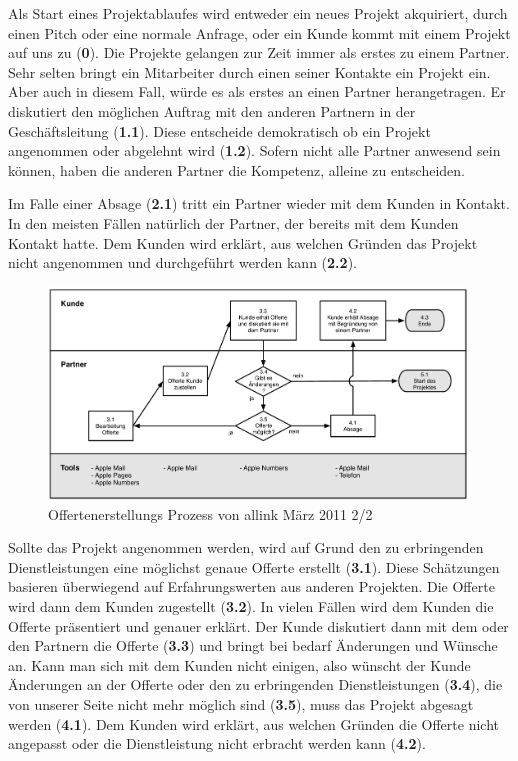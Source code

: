Als Start eines Projektablaufes wird entweder ein neues Projekt akquiriert, 
durch einen Pitch oder eine normale Anfrage, oder ein Kunde kommt mit einem
Projekt auf uns zu (\textbf{0}).
Die Projekte gelangen zur Zeit immer als erstes zu einem Partner. Sehr selten
bringt ein Mitarbeiter durch einen seiner Kontakte ein Projekt ein. Aber auch in
diesem Fall, würde es als erstes an einen Partner herangetragen.
Er diskutiert den möglichen Auftrag mit den anderen Partnern in der Geschäftsleitung (\textbf{1.1}).
Diese entscheide demokratisch ob ein Projekt angenommen oder abgelehnt wird (\textbf{1.2}). 
Sofern nicht alle Partner anwesend sein können, haben die anderen Partner
die Kompetenz, alleine zu entscheiden.

Im Falle einer Absage (\textbf{2.1}) tritt ein Partner wieder mit dem Kunden in Kontakt.
In den meisten Fällen natürlich der Partner, der bereits mit dem Kunden Kontakt
hatte. Dem Kunden wird erklärt, aus welchen Gründen das Projekt nicht angenommen
und durchgeführt werden kann (\textbf{2.2}).

\begin{figure}[htbp]
\begin{center}
\includegraphics[width=0.99\textwidth,angle=0]{./bilder/analyse/01_ist_prozesse_offerte_02.pdf}
\caption{Offertenerstellungs Prozess von allink März 2011 2/2}
\label{pic:01_ist_prozesse_offerte_02}
\end{center}
\end{figure}

Sollte das Projekt angenommen werden, wird auf Grund den zu erbringenden
Dienstleistungen eine möglichst genaue Offerte erstellt (\textbf{3.1}). Diese Schätzungen
basieren überwiegend auf Erfahrungswerten aus anderen Projekten.
Die Offerte wird dann dem Kunden zugestellt (\textbf{3.2}). In vielen Fällen wird dem Kunden
die Offerte präsentiert und genauer erklärt.
Der Kunde diskutiert dann mit dem oder den Partnern die Offerte (\textbf{3.3}) und bringt
bei bedarf Änderungen und Wünsche an.
Kann man sich mit dem Kunden nicht einigen, also wünscht der Kunde Änderungen
an der Offerte oder den zu erbringenden Dienstleistungen (\textbf{3.4}), die von unserer Seite
nicht mehr möglich sind (\textbf{3.5}), muss das Projekt abgesagt werden (\textbf{4.1}).
Dem Kunden wird erklärt, aus welchen Gründen die Offerte nicht angepasst oder
die Dienstleistung nicht erbracht werden kann (\textbf{4.2}).

